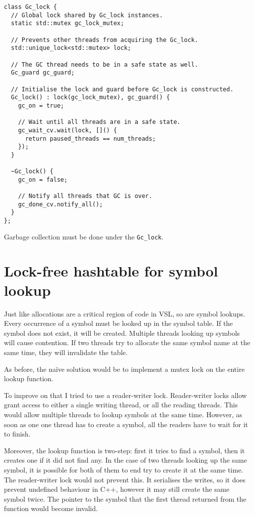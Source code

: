 \begin{code}
\begin{verbatim}
class Gc_lock {
  // Global lock shared by Gc_lock instances.
  static std::mutex gc_lock_mutex;

  // Prevents other threads from acquiring the Gc_lock.
  std::unique_lock<std::mutex> lock;

  // The GC thread needs to be in a safe state as well.
  Gc_guard gc_guard;

  // Initialise the lock and guard before Gc_lock is constructed.
  Gc_lock() : lock(gc_lock_mutex), gc_guard() {
    gc_on = true;

    // Wait until all threads are in a safe state.
    gc_wait_cv.wait(lock, []() {
      return paused_threads == num_threads;
    });
  }

  ~Gc_lock() {
    gc_on = false;

    // Notify all threads that GC is over.
    gc_done_cv.notify_all();
  }
};
\end{verbatim}
\caption{Garbage collection must be done under the \texttt{Gc\_lock}.}
\label{code:gc-lock}
\end{code}

\section{Lock-free hashtable for symbol lookup}
\label{sec:hashtable}
Just like allocations are a critical region of code in VSL, so are symbol lookups.
Every occurrence of a symbol must be looked up in the symbol table. If the symbol does
not exist, it will be created. Multiple threads looking up symbols will cause contention.
If two threads try to allocate the same symbol name at the same time, they will invalidate
the table.

As before, the na\"ive solution would be to implement a mutex lock on the entire
lookup function.

To improve on that I tried to use a reader-writer lock. Reader-writer locks allow grant access
to either a single writing thread, or all the reading threads. This would allow multiple
threads to lookup symbols at the same time. However, as soon as one one thread has to create a
symbol, all the readers have to wait for it to finish.

Moreover, the lookup function is two-step: first it tries to find a symbol, then it creates one
if it did not find any. In the case of two threads looking up the same symbol, it is possible for
both of them to end try to create it at the same time. The reader-writer lock would not prevent this.
It serialises the writes, so it does prevent undefined behaviour in C++, however it may
still create the same symbol twice. The pointer to the symbol that the first thread returned from the function
would become invalid.

